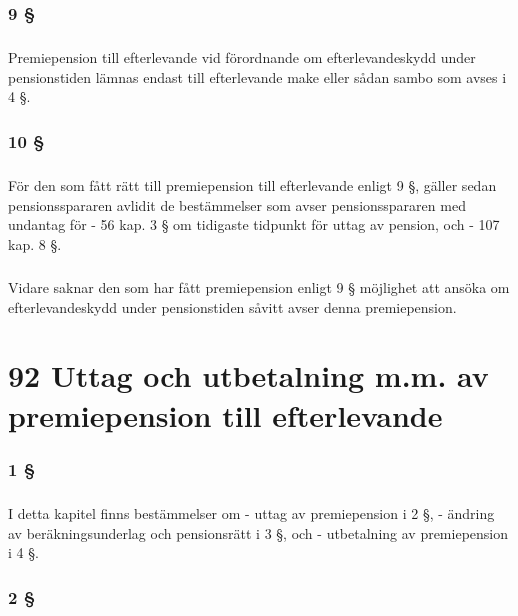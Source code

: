\documentclass[a4paper,notitlepage,openany,10pt]{book}
\begin{document}
\subsection*{9 §}
\paragraph*{}
Premiepension till efterlevande vid förordnande om efterlevandeskydd under pensionstiden lämnas endast till efterlevande make eller sådan sambo som avses i 4 §.
\subsection*{10 §}
\paragraph*{}
För den som fått rätt till premiepension till efterlevande enligt 9 §, gäller sedan pensionsspararen avlidit de bestämmelser som avser pensionsspararen med undantag för
\newline - 56 kap. 3 § om tidigaste tidpunkt för uttag av pension, och
\newline - 107 kap. 8 §.
\paragraph*{}
Vidare saknar den som har fått premiepension enligt 9 § möjlighet att ansöka om efterlevandeskydd under pensionstiden såvitt avser denna premiepension.
\chapter*{92 Uttag och utbetalning m.m. av premiepension till efterlevande}
\subsection*{1 §}
\paragraph*{}
I detta kapitel finns bestämmelser om
\newline - uttag av premiepension i 2 §,
\newline - ändring av beräkningsunderlag och pensionsrätt i 3 §, och
\newline - utbetalning av premiepension i 4 §.
\subsection*{2 §}
\end{document}
